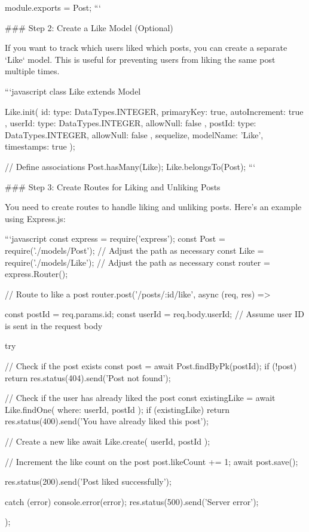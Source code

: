 module.exports = Post;
```

### Step 2: Create a Like Model (Optional)

If you want to track which users liked which posts, you can create a separate `Like` model. This is useful for preventing users from liking the same post multiple times.

```javascript
class Like extends Model {}

Like.init({
  id: {
    type: DataTypes.INTEGER,
    primaryKey: true,
    autoIncrement: true
  },
  userId: {
    type: DataTypes.INTEGER,
    allowNull: false
  },
  postId: {
    type: DataTypes.INTEGER,
    allowNull: false
  }
}, {
  sequelize,
  modelName: 'Like',
  timestamps: true
});

// Define associations
Post.hasMany(Like);
Like.belongsTo(Post);
```

### Step 3: Create Routes for Liking and Unliking Posts

You need to create routes to handle liking and unliking posts. Here’s an example using Express.js:

```javascript
const express = require('express');
const Post = require('./models/Post'); // Adjust the path as necessary
const Like = require('./models/Like'); // Adjust the path as necessary
const router = express.Router();

// Route to like a post
router.post('/posts/:id/like', async (req, res) => {
  const postId = req.params.id;
  const userId = req.body.userId; // Assume user ID is sent in the request body

  try {
    // Check if the post exists
    const post = await Post.findByPk(postId);
    if (!post) {
      return res.status(404).send('Post not found');
    }

    // Check if the user has already liked the post
    const existingLike = await Like.findOne({ where: { userId, postId } });
    if (existingLike) {
      return res.status(400).send('You have already liked this post');
    }

    // Create a new like
    await Like.create({ userId, postId });

    // Increment the like count on the post
    post.likeCount += 1;
    await post.save();

    res.status(200).send('Post liked successfully');
  } catch (error) {
    console.error(error);
    res.status(500).send('Server error');
  }
});

